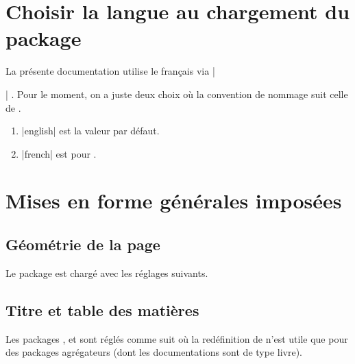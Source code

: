 \documentclass[10pt, a4paper]{article}
\begin{document}
\section{Choisir la langue au chargement du package}

La présente documentation utilise le français via \bdocinlatex|\usepackage[lang = french]{bdoc}| .
Pour le moment, on a juste deux choix où la convention de nommage suit celle de .

\begin{enumerate}
    \item \bdocinlatex|english| est la valeur par défaut.

    \item \bdocinlatex|french| est pour .
\end{enumerate}


\section{Mises en forme générales imposées}

\subsection{Géométrie de la page}

Le package  est chargé avec les réglages suivants.

\begin{bdoclatex}[code]
\RequirePackage[
  top            = 2.5cm,
  bottom         = 2.5cm,
  left           = 2.5cm,
  right          = 2.5cm,
  marginparwidth = 2cm,
  marginparsep   = 2mm,
  heightrounded
]{geometry}
\end{bdoclatex}



\subsection{Titre et table des matières}

Les packages ,  et  sont réglés comme suit où la redéfinition de  n'est utile que pour des packages agrégateurs (dont les documentations sont de type livre).
\end{document}
